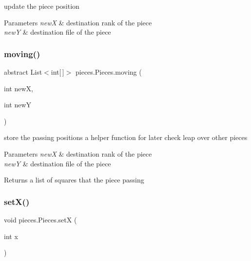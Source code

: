 update the piece position 
\begin{DoxyParams}{Parameters}
{\em newX} & destination rank of the piece \\
\hline
{\em newY} & destination file of the piece \\
\hline
\end{DoxyParams}
\mbox{\label{classpieces_1_1_pieces_a28711472a94edf18be7c8300cf0cc64b}} 
\subsubsection{\texorpdfstring{moving()}{moving()}}
{\footnotesize\ttfamily abstract List$<$int\mbox{[}$\,$\mbox{]}$>$ pieces.\+Pieces.\+moving (\begin{DoxyParamCaption}\item[{int}]{newX,  }\item[{int}]{newY }\end{DoxyParamCaption})\hspace{0.3cm}{\ttfamily [abstract]}}

store the passing positions a helper function for later check leap over other pieces 
\begin{DoxyParams}{Parameters}
{\em newX} & destination rank of the piece \\
\hline
{\em newY} & destination file of the piece \\
\hline
\end{DoxyParams}
\begin{DoxyReturn}{Returns}
a list of squares that the piece passing 
\end{DoxyReturn}
\mbox{\label{classpieces_1_1_pieces_ab54853b850ad823a067bdab91b907b86}} 
\subsubsection{\texorpdfstring{set\+X()}{setX()}}
{\footnotesize\ttfamily void pieces.\+Pieces.\+setX (\begin{DoxyParamCaption}\item[{int}]{x }\end{DoxyParamCaption})\hspace{0.3cm}{\ttfamily [inline]}}

